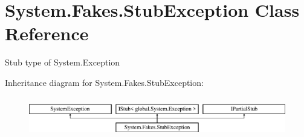 \hypertarget{class_system_1_1_fakes_1_1_stub_exception}{\section{System.\-Fakes.\-Stub\-Exception Class Reference}
\label{class_system_1_1_fakes_1_1_stub_exception}
}


Stub type of System.\-Exception 


Inheritance diagram for System.\-Fakes.\-Stub\-Exception\-:\begin{figure}[H]
\begin{center}
\leavevmode
\includegraphics[height=1.786284cm]{class_system_1_1_fakes_1_1_stub_exception}
\end{center}
\end{figure}
